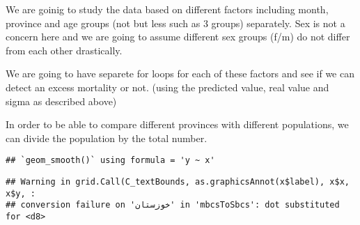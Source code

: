 \documentclass[
]{article}
\newenvironment{Shaded}{\begin{snugshade}}{\end{snugshade}}
\newcommand{\AttributeTok}[1]{\textcolor[rgb]{0.77,0.63,0.00}{#1}}
\newcommand{\DecValTok}[1]{\textcolor[rgb]{0.00,0.00,0.81}{#1}}
\newcommand{\FunctionTok}[1]{\textcolor[rgb]{0.00,0.00,0.00}{#1}}
\newcommand{\NormalTok}[1]{#1}
\newcommand{\OtherTok}[1]{\textcolor[rgb]{0.56,0.35,0.01}{#1}}
\newcommand{\SpecialCharTok}[1]{\textcolor[rgb]{0.00,0.00,0.00}{#1}}
\newcommand{\StringTok}[1]{\textcolor[rgb]{0.31,0.60,0.02}{#1}}
\begin{document}
We are goinig to study the data based on different factors including
month, province and age groups (not but less such as 3 groups)
separately. Sex is not a concern here and we are going to assume
different sex groups (f/m) do not differ from each other drastically.

We are going to have separete for loops for each of these factors and
see if we can detect an excess mortality or not. (using the predicted
value, real value and sigma as described above)

In order to be able to compare different provinces with different
populations, we can divide the population by the total number.

\begin{Shaded}
\end{Shaded}

\begin{verbatim}
## `geom_smooth()` using formula = 'y ~ x'
\end{verbatim}

\begin{verbatim}
## Warning in grid.Call(C_textBounds, as.graphicsAnnot(x$label), x$x, x$y, :
## conversion failure on 'خوزستان' in 'mbcsToSbcs': dot substituted for <d8>
\end{verbatim}
\end{document}
